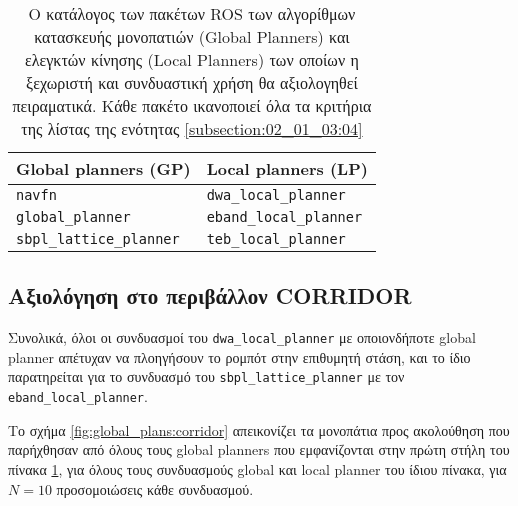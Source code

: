 \begin{table}\centering
\begin{tabular}{l|l}
  Global planners (GP) & Local planners (LP) \\ \toprule
  \texttt{navfn} & \texttt{dwa\_local\_planner} \\
  \texttt{global\_planner} & \texttt{eband\_local\_planner} \\
  \texttt{sbpl\_lattice\_planner} & \texttt{teb\_local\_planner} \\ \bottomrule
\end{tabular}
  \caption{\small Ο κατάλογος των πακέτων ROS των αλγορίθμων κατασκευής
           μονοπατιών (Global Planners) και ελεγκτών κίνησης (Local Planners)
           των οποίων η ξεχωριστή και συνδυαστική χρήση θα αξιολογηθεί
           πειραματικά. Κάθε πακέτο ικανοποιεί όλα τα κριτήρια της λίστας
           της ενότητας \ref{subsection:02_01_03:04}}
\label{tbl:planners_sifted_list}
\end{table}


\subsection{Αξιολόγηση στο περιβάλλον CORRIDOR}
\label{subsection:02_01_04:02}

Συνολικά, όλοι οι συνδυασμοί του \texttt{dwa\_local\_planner} με οποιονδήποτε
global planner απέτυχαν να πλοηγήσουν το ρομπότ στην επιθυμητή στάση, και το
ίδιο παρατηρείται για το συνδυασμό του \texttt{sbpl\_lattice\_planner} με τον
\texttt{eband\_local\_planner}.

Το σχήμα \ref{fig:global_plans:corridor} απεικονίζει τα μονοπάτια προς
ακολούθηση που παρήχθησαν από όλους τους global planners που εμφανίζονται στην
πρώτη στήλη του πίνακα \ref{tbl:planners_sifted_list}, για όλους τους
συνδυασμούς global και local planner του ίδιου πίνακα, για $N=10$ προσομοιώσεις
κάθε συνδυασμού.

